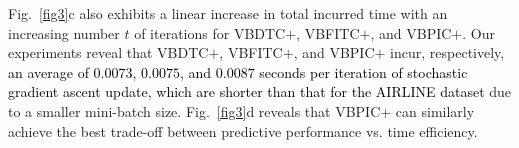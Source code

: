 \documentclass[conference]{IEEEtran}
\begin{document}
		Fig.~\ref{fig3}c also exhibits a linear increase in total incurred time with an increasing number $t$ of iterations for VBDTC$+$, VBFITC$+$, and VBPIC$+$. Our experiments reveal that VBDTC$+$, VBFITC$+$, and VBPIC$+$ incur, respectively, \textcolor{black}{an average of $0.0073$, $0.0075$, and $0.0087$ seconds per iteration of stochastic gradient ascent update, which are shorter than that for the AIRLINE dataset} 
due to a smaller mini-batch size.		
Fig.~\ref{fig3}d reveals that VBPIC$+$ can similarly achieve the best trade-off between predictive performance vs. time efficiency.
		
\end{document}
